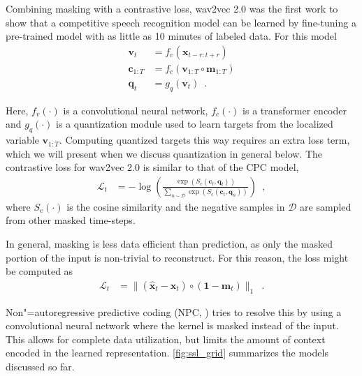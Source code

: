 {Combining masking with a contrastive loss, wav2vec 2.0 was the first work to show that a competitive speech recognition model can be learned by fine-tuning a pre-trained model with as little as 10 minutes of labeled data. For this model
%
\begin{align}
    \mathbf{v}_{t} &= f_v(\mathbf{x}_{t-r:t+r}) \\
    \mathbf{c}_{1:T} &= f_c(\mathbf{v}_{1:T} \circ \mathbf{m}_{1:T}) \\
    \mathbf{q}_t &= g_q(\mathbf{v}_t) \enspace . \label{eq_brief: w2v2 qtz}
\end{align}

\noindent Here, $f_v(\cdot)$ is a convolutional neural network, $f_c(\cdot)$ is a transformer encoder \parencite{vaswani_attention_2017} and $g_q(\cdot)$ is a quantization module used to learn targets from the localized variable $\mathbf{v}_{1:T}$. Computing quantized targets this way requires an extra loss term, which we will present when we discuss quantization in general below. The contrastive loss for wav2vec 2.0 is similar to that of the CPC model,
%
\begin{align}
    \mathcal{L}_t &= - \log \left(\frac{\exp(S_{\text{c}}(\mathbf{c}_{t}, \mathbf{q}_{t}))}{\sum_{n \sim \mathcal{D}} \exp(S_{\text{c}}(\mathbf{c}_{t}, \mathbf{q}_{n}))} \right) \enspace , \label{eq_brief: w2v2 loss}
\end{align}
%
\noindent where $S_{\text{c}}(\cdot)$ is the cosine similarity and the negative samples in $\mathcal{D}$ are sampled from other masked time-steps. 

In general, masking is less data efficient than prediction, as only the masked portion of the input is non-trivial to reconstruct. For this reason, the loss might be computed as
%
\begin{align}
    \mathcal{L}_t &= \lVert (\mathbf{\hat{x}}_{t} - \mathbf{x}_{t}) \circ (\mathbf{1} - \mathbf{m}_t) \rVert_1 \enspace .
\end{align}

\noindent Non"=autoregressive predictive coding (NPC, \citealp{liu_nonautoregressive_2020}) tries to resolve this by using a convolutional neural network where the kernel is masked instead of the input.
This allows for complete data utilization, but limits the amount of context encoded in the learned representation.
\cref{fig:ssl_grid} summarizes the models discussed so far.

}
